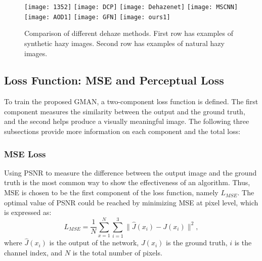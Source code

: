 \documentclass[journal]{IEEEtran}
\begin{document}
\begin{figure*}
	\texttt{[image: 1352]}
	\texttt{[image: DCP]}
	\texttt{[image: Dehazenet]}
	\texttt{[image: MSCNN]}
	\texttt{[image: AOD1]}
	\texttt{[image: GFN]}
	\texttt{[image: ours1]}
	\centering
\end{figure*}
\begin{figure*}
	\captionsetup{justification=centering}
	\centering
	\caption{Comparison of different dehaze methods. First row has examples of synthetic hazy images. Second row has examples of natural hazy images.}
	\label{figComp}
\end{figure*}

\subsection{Loss Function: MSE and Perceptual Loss}

To train the proposed GMAN, a two-component loss function is defined. The first component measures the similarity between the output and the ground truth, and the second helps produce a visually meaningful image. The following three subsections provide more information on each component and the total loss:

\subsubsection{MSE Loss}

Using PSNR to measure the difference between the output image and the ground truth is the most common way to show the effectiveness of an algorithm. Thus, MSE is chosen to be the first component of the loss function, namely $L_{MSE}$. The optimal value of PSNR could be reached by minimizing MSE at pixel level, which is expressed as:
\begin{equation}
L_{MSE}=\frac{1}{N}\sum_{x=1}^{N}\sum_{i=1}^{3}\parallel\hat{J}(x_{i})-J(x_{i})\parallel^2,
\end{equation}
where $\hat{J}(x_{i})$ is the output of the network, $J(x_{i})$ is the ground truth, $i$ is the channel index, and $N$ is the total number of pixels.
\end{document}
